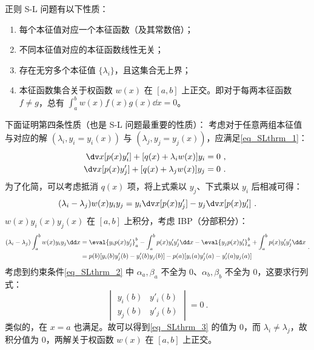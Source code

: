 正则 S-L 问题有以下性质：
\begin{enumerate}
\item 每个本征值对应一个本征函数（及其常数倍）；
\item 不同本征值对应的本征函数线性无关；
\item 存在无穷多个本征值 $\{\lambda_i\}$，且这集合无上界；
\item 本征函数集合关于权函数 $w(x)$ 在 $[a,b]$ 上正交。即对于每两本征函数 $f \neq g$，总有 $\int_a^b w(x)f(x)g(x) \dd x = 0$。 
\end{enumerate}
下面证明第四条性质（也是 S-L 问题最重要的性质）：
考虑对于任意两组本征值与对应的解 $(\lambda_i, y_i=y_i(x))$ 与 $(\lambda_j, y_j=y_j(x))$，应满足\autoref{eq_SLthrm_1}：
\begin{equation}
\begin{aligned}
\dv x [p(x) y'_i] + [q(x) + \lambda_i w(x)] y_i &= 0 ~,\\
\dv x [p(x) y'_j] + [q(x) + \lambda_j w(x)] y_j &= 0 ~.
\end{aligned} ~~
\end{equation}
为了化简，可以考虑抵消 $q(x)$ 项，将上式乘以 $y_j$、下式乘以 $y_i$ 后相减可得：
\begin{equation}
(\lambda_i - \lambda_j)w(x) y_i y_j = y_i \dv x [p(x) y'_j] - y_j \dv x [p(x) y'_i] ~.
\end{equation}
$w(x)y_i(x) y_j(x)$ 在 $[a, b]$ 上积分，考虑 IBP（分部积分）：
\begin{equation}\label{eq_SLthrm_3}
\begin{aligned}
(\lambda_i - \lambda_j) \int_a^b w(x) y_i y_j \dd x &= \eval{y_i p(x) y'_j}_a^b - \int_a^b p(x) y'_i y'_j \dd x - \eval{y_j p(x) y'_i}_a^b + \int_a^b p(x) y'_i y'_j \dd x\\
&= p(b) [y_i(b) y'_j(b) - y'_i(b) y_j(b)] - p(a) [y_i(a) y'_j(a) - y'_i(a) y_j(a)] 
\end{aligned} ~.
\end{equation}
考虑到约束条件\autoref{eq_SLthrm_2} 中 $\alpha_a, \beta_a$ 不全为 $0$、$\alpha_b, \beta_b$ 不全为 $0$，这要求行列式：
\begin{equation}
\begin{vmatrix}
y_i(b) & y'_i(b) \\
y_j(b) & y'_j(b)
\end{vmatrix} = 0~.
\end{equation}
类似的，在 $x=a$ 也满足。故可以得到\autoref{eq_SLthrm_3} 的值为 $0$，而 $\lambda_i \neq \lambda_j$，故积分值为 $0$，两解关于权函数 $w(x)$ 在 $[a, b]$ 上正交。


